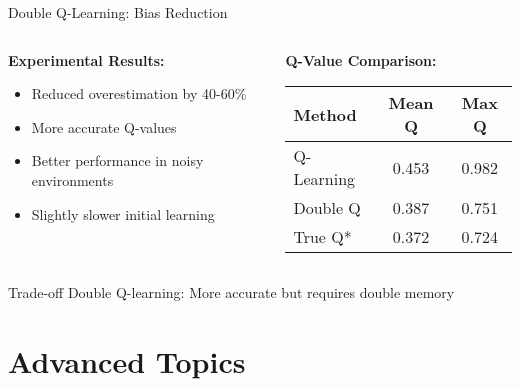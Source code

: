 \documentclass[aspectratio=169,10pt]{beamer}
\begin{document}
\begin{frame}{Double Q-Learning: Bias Reduction}
\begin{columns}[T]
\begin{column}{0.5\textwidth}
\textbf{Experimental Results:}
\begin{itemize}
    \item Reduced overestimation by 40-60\%
    \item More accurate Q-values
    \item Better performance in noisy environments
    \item Slightly slower initial learning
\end{itemize}
\end{column}
\begin{column}{0.5\textwidth}
\textbf{Q-Value Comparison:}
\begin{center}
\begin{tabular}{|l|c|c|}
\hline
\textbf{Method} & \textbf{Mean Q} & \textbf{Max Q} \\
\hline
Q-Learning & 0.453 & 0.982 \\
Double Q & 0.387 & 0.751 \\
True Q* & 0.372 & 0.724 \\
\hline
\end{tabular}
\end{center}
\end{column}
\end{columns}

\vspace{1em}
\begin{alertblock}{Trade-off}
Double Q-learning: More accurate but requires double memory
\end{alertblock}
\end{frame}

\section{Advanced Topics}
\end{document}
